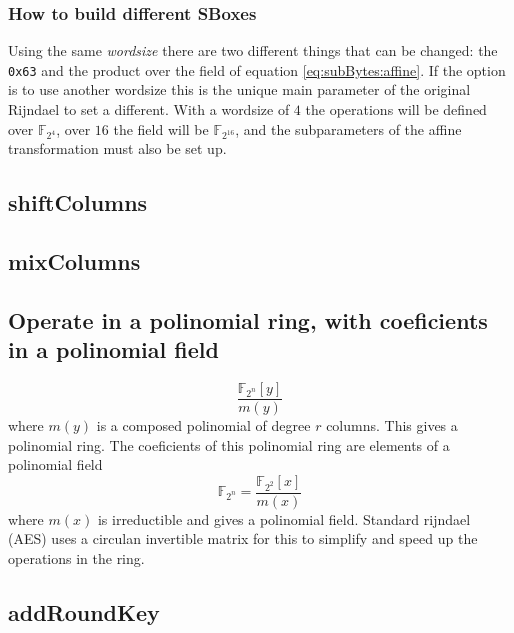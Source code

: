 \documentclass[a4paper,twoside]{llncs}
\newcommand{\Fpn}[2]{\ensuremath{\mathbb{F}_{#1^#2}}}
\newcommand{\Fpnm}[2]{\ensuremath{\frac{\Fpn{2}{#1}[#2]}{m(#2)}}}
\begin{document}

\subsubsection{How to build different SBoxes}

Using the same \emph{wordsize} there are two different things that can be changed: the \texttt{0x63} and the product over the field of equation \ref{eq:subBytes:affine}. If the option is to use another wordsize this is the unique main parameter of the original Rijndael to set a different. With a wordsize of $4$ the operations will be defined over \Fpn{2}{4}, over $16$ the field will be \Fpn{2}{{16}}, and the subparameters of the affine transformation must also be set up.

\subsection{shiftColumns}

\subsection{mixColumns}
\subsection{Operate in a polinomial ring, with coeficients in a polinomial field}
$$\Fpnm{n}{y}\label{eq:polinomialRing}$$ where $m(y)$ is a composed polinomial of degree $r$ columns. This gives a polinomial ring. The coeficients of this polinomial ring are elements of a polinomial field $$\Fpn{2}{n}=\Fpnm{2}{x}\label{eq:polinomialField}$$ where $m(x)$ is irreductible and gives a polinomial field.
Standard rijndael (AES) uses a circulan invertible matrix for this to simplify and speed up the operations in the ring.

\subsection{addRoundKey}
\end{document}
